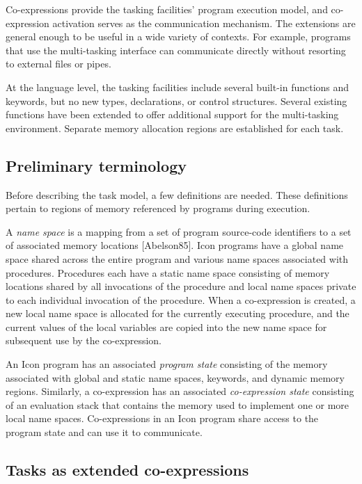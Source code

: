 Co-expressions provide the tasking facilities' program
execution model, and co-expression activation serves as the
communication mechanism. The extensions are general enough to be useful
in a wide variety of contexts. For example, programs that use the
multi-tasking interface can communicate directly without resorting to
external files or pipes.

At the language level, the tasking facilities include several
built-in functions and keywords, but no new types, declarations, or
control structures. Several existing functions have been extended to
offer additional support for the multi-tasking environment. 
Separate memory allocation regions are established for each task. 

\subsection{Preliminary terminology}

Before describing the task model, a few definitions are needed. These
definitions pertain to regions of memory referenced by programs during
execution. 

A \textit{name space} is a mapping from a set of program source-code
identifiers to a set of associated memory locations [Abelson85]. Icon
programs have a global name space shared across the entire program and
various name spaces associated with procedures. Procedures each have a
static name space consisting of memory locations shared by all
invocations of the procedure and local name spaces private to each
individual invocation of the procedure.
When a co-expression is created, a new local name space is allocated for
the currently executing procedure, and the current values of the local
variables are copied into the new name space for subsequent use by the
co-expression. 

An Icon program has an associated \textit{program state} consisting of
the memory associated with global and static name spaces, keywords, and
dynamic memory regions. Similarly, a co-expression has an associated
\textit{co-expression state} consisting of an evaluation stack that
contains the memory used to implement one or more local name spaces.
Co-expressions in an Icon program share access to the program state and
can use it to communicate. 

\subsection{Tasks as extended co-expressions}

